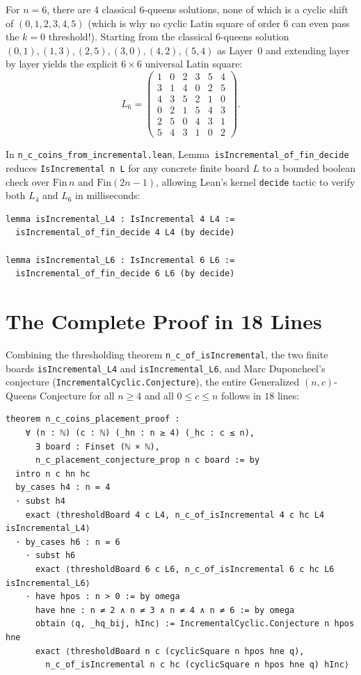 \documentclass[11pt,a4paper]{article}
\theoremstyle{remark}
\begin{document}
For $n = 6$, there are $4$ classical $6$-queens solutions, none of which is a cyclic shift of $(0, 1, 2, 3, 4, 5)$ (which is why no cyclic Latin square of order $6$ can even pass the $k = 0$ threshold!). Starting from the classical $6$-queens solution $(0,1), (1,3), (2,5), (3,0), (4,2), (5,4)$ as Layer~$0$ and extending layer by layer yields the explicit $6 \times 6$ universal Latin square:
\[
  L_6 = \begin{pmatrix}
    1 & 0 & 2 & 3 & 5 & 4 \\
    3 & 1 & 4 & 0 & 2 & 5 \\
    4 & 3 & 5 & 2 & 1 & 0 \\
    0 & 2 & 1 & 5 & 4 & 3 \\
    2 & 5 & 0 & 4 & 3 & 1 \\
    5 & 4 & 3 & 1 & 0 & 2
  \end{pmatrix}.
\]

In \texttt{n\_c\_coins\_from\_incremental.lean}, Lemma~\texttt{isIncremental\_of\_fin\_decide} reduces \texttt{IsIncremental n L} for any concrete finite board $L$ to a bounded boolean check over $\mathrm{Fin}\,n$ and $\mathrm{Fin}(2n - 1)$, allowing Lean's kernel \texttt{decide} tactic to verify both $L_4$ and $L_6$ in milliseconds:
\begin{lstlisting}[language=Lean4]
lemma isIncremental_L4 : IsIncremental 4 L4 :=
  isIncremental_of_fin_decide 4 L4 (by decide)

lemma isIncremental_L6 : IsIncremental 6 L6 :=
  isIncremental_of_fin_decide 6 L6 (by decide)
\end{lstlisting}

\section{The Complete Proof in 18 Lines}

Combining the thresholding theorem \texttt{n\_c\_of\_isIncremental}, the two finite boards \texttt{isIncremental\_L4} and \texttt{isIncremental\_L6}, and Marc Duponcheel's conjecture (\texttt{IncrementalCyclic.Conjecture}), the entire Generalized $(n,c)$-Queens Conjecture for all $n \ge 4$ and all $0 \le c \le n$ follows in $18$ lines:
\begin{lstlisting}[language=Lean4]
theorem n_c_coins_placement_proof :
    ∀ (n : ℕ) (c : ℕ) (_hn : n ≥ 4) (_hc : c ≤ n),
      ∃ board : Finset (ℕ × ℕ),
      n_c_placement_conjecture_prop n c board := by
  intro n c hn hc
  by_cases h4 : n = 4
  · subst h4
    exact ⟨thresholdBoard 4 c L4, n_c_of_isIncremental 4 c hc L4 isIncremental_L4⟩
  · by_cases h6 : n = 6
    · subst h6
      exact ⟨thresholdBoard 6 c L6, n_c_of_isIncremental 6 c hc L6 isIncremental_L6⟩
    · have hpos : n > 0 := by omega
      have hne : n ≠ 2 ∧ n ≠ 3 ∧ n ≠ 4 ∧ n ≠ 6 := by omega
      obtain ⟨q, _hq_bij, hInc⟩ := IncrementalCyclic.Conjecture n hpos hne
      exact ⟨thresholdBoard n c (cyclicSquare n hpos hne q),
        n_c_of_isIncremental n c hc (cyclicSquare n hpos hne q) hInc⟩
\end{lstlisting}
\end{document}
